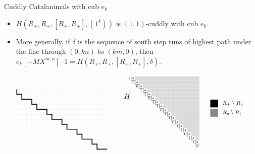 \documentclass{beamer}
\newcommand{\mymidgray}{black!47}  %
\newcounter{c}
\begin{document}
\begin{frame}{Cuddly Catalanimals with cub \(e_k\)}
  \begin{itemize}
  \item \(H(R_+,R_+,[R_+,R_+],(1^k))\) is \((1,1)\)-cuddly with cub \(e_k\).\pause
  \item More generally, if \(\delta\) is the sequence of south step
    runs of highest path under the line through \((0,kn)\) to
    \((km,0)\), then \(e_k[-MX^{m,n}] \cdot 1 = H(R_+,R_+,[R_+,R_+],\delta)\).\pause
  \end{itemize}
  \[
  \begin{array}{c@{\quad\quad}cr}
  \begin{tikzpicture}[scale=0.25]
      \draw[step=1cm,gray!20,very thin] (0,0) grid (18,12);
      \draw[step=1cm,gray!20,very thin] (0,12)--(18,0);
      \foreach \off in {0,1,2,3,4,5} {
      \draw[very thick] (0+3*\off,12-2*\off)--(0+3*\off,11-2*\off)--(1+3*\off,11-2*\off)--(1+3*\off,10-2*\off)--(3+3*\off,10-2*\off);
      }
    \end{tikzpicture}
    &
      \begin{tikzpicture}[scale=0.2]
        \foreach \j in {1,...,17} {
          \draw[draw = none, fill = gray!100] (\j+0.5, -\j-0.5) circle (.2);
        }
        \foreach \j in {1,...,16} {
          \pgfmathsetmacro{\z}{\j+1}
          \foreach \i in {\z,...,17} {
            \draw[draw = none, fill = black!14] (\i,-\j) rectangle (\i+1,-\j-1);
          }
        }
        \draw[thin] (1,-1) -- (1,-2);
        \foreach \j in {2,...,17} {
          \draw[thin] (\j-1,-\j) -- (\j,-\j);
          \draw[thin] (\j,-\j) -- (\j,-\j-1);
        }
        \draw[thin] (17,-18) -- (18,-18);
        \foreach \j in {0,...,5} {
          \node at (3*\j+0.5,-3*\j-1.5) {\tiny \(1\)};
          \node at (3*\j+1.5,-3*\j-2.5) {\tiny \(1\)};
          \node at (3*\j+2.5,-3*\j-3.5) {\tiny \(0\)};
        }
        \node at (0,-6) {\(H\)};
      \end{tikzpicture}
    &\raisebox{16mm}{
\begin{tikzpicture}[scale = .39]
\begin{scope}
\draw[draw = none, fill = black!100] (2,-1) rectangle (3,-2);
\node[anchor = west] at (3,-1.5) {\scriptsize  \  $R_+ \setminus R_q$};
\end{scope}
\begin{scope}[yshift = -34*1]
\draw[draw = none, fill = \mymidgray] (2,-1) rectangle (3,-2);
\node[anchor = west] at (3,-1.5) {\scriptsize  \  $R_q \setminus R_t$};
\end{scope}

\end{tikzpicture}}
\end{array}\]
\end{frame}
\end{document}
